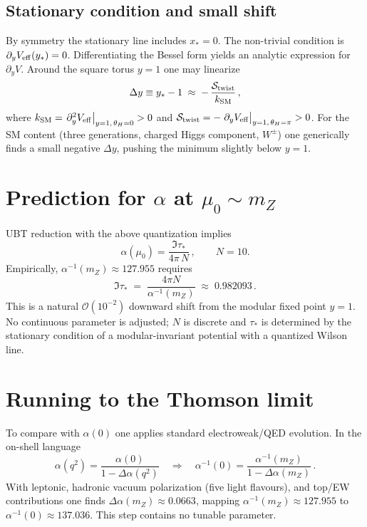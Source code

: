 \documentclass[11pt,a4paper]{article}
\begin{document}
\subsection*{Stationary condition and small shift}
By symmetry the stationary line includes \(x_*=0\). The non-trivial condition is \(\partial_y V_{\rm eff}(y_*)=0\). Differentiating the Bessel form yields an analytic expression for \(\partial_y V\). Around the square torus \(y=1\) one may linearize
\begin{equation}
\Delta y \equiv y_* - 1 \;\approx\; -\,\frac{\mathcal{S}_{\rm twist}}{k_{\rm SM}}\,,
\end{equation}
where \(k_{\rm SM}=\eval{\partial_y^2 V_{\rm eff}}_{y=1,\,\theta_H=0}>0\) and \(\mathcal{S}_{\rm twist}= -\eval{\partial_y V_{\rm eff}}_{y=1,\,\theta_H=\pi}>0\). For the SM content (three generations, charged Higgs component, \(W^{\pm}\)) one generically finds a small negative \(\Delta y\), pushing the minimum slightly below \(y=1\).

\section{Prediction for \(\alpha\) at \(\mu_0\sim m_Z\)}
UBT reduction with the above quantization implies
\begin{equation}
\boxed{\quad \alpha(\mu_0)=\frac{\Im\tau_*}{4\pi\,N}\,,\qquad N=10.\quad}
\end{equation}
Empirically, \(\alpha^{-1}(m_Z)\approx 127.955\) requires
\begin{equation}
\Im\tau_*\;=\;\frac{4\pi N}{\alpha^{-1}(m_Z)}\;\approx\;0.982093\,.
\end{equation}
This is a natural \(\mathcal{O}(10^{-2})\) downward shift from the modular fixed point \(y=1\). No continuous parameter is adjusted; \(N\) is discrete and \(\tau_*\) is determined by the stationary condition of a modular-invariant potential with a quantized Wilson line.

\section{Running to the Thomson limit}
To compare with \(\alpha(0)\) one applies standard electroweak/QED evolution. In the on-shell language
\begin{equation}
\alpha(q^2)=\frac{\alpha(0)}{1-\Delta\alpha(q^2)}\quad\Rightarrow\quad \alpha^{-1}(0)=\frac{\alpha^{-1}(m_Z)}{1-\Delta\alpha(m_Z)}\,.
\end{equation}
With leptonic, hadronic vacuum polarization (five light flavours), and top/EW contributions one finds \(\Delta\alpha(m_Z)\approx 0.0663\), mapping \(\alpha^{-1}(m_Z)\approx 127.955\) to \(\alpha^{-1}(0)\approx 137.036\). This step contains no tunable parameter.
\end{document}
